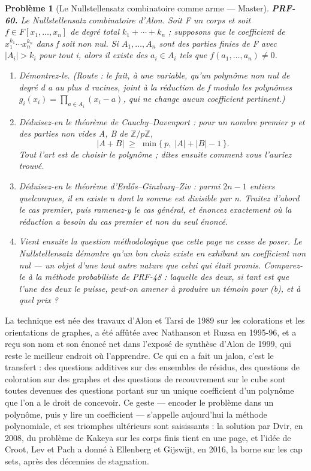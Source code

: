 \documentclass[11pt]{article}
\newtheorem{problem}{Problème}
\begin{document}
\begin{problem}[{Le Nullstellensatz combinatoire comme arme --- Master}]
\textbf{PRF-60.} Le Nullstellensatz combinatoire d'Alon. Soit F un corps et soit
$ f \in F[x_1, \dots, x_n] $ de degré total $ k_1 + \cdots + k_n $ ; supposons que le
coefficient de $ x_1^{k_1} \cdots x_n^{k_n} $ dans f soit non nul. Si
$ A_1, \dots, A_n $ sont des parties finies de F avec $ |A_i| > k_i $ pour tout i, alors
il existe des $ a_i \in A_i $ tels que $ f(a_1, \dots, a_n) \ne 0 $.
\begin{enumerate}
\item[(a)] Démontrez-le. (Route : le fait, à une variable, qu'un polynôme non nul de degré d a au
plus d racines, joint à la réduction de f modulo les polynômes
$ g_i(x_i) = \prod_{a \in A_i} (x_i - a) $, qui ne change aucun coefficient
pertinent.)
\item[(b)] Déduisez-en le théorème de Cauchy--Davenport : pour un nombre premier p et des parties
non vides A, B de $ \mathbb{Z}/p\mathbb{Z} $,
\[ |A + B| \;\ge\; \min\{\, p,\; |A| + |B| - 1 \,\}. \]
Tout l'art est de choisir le polynôme ; dites ensuite comment vous l'auriez
trouvé.
\item[(c)] Déduisez-en le théorème d'Erd\H{o}s--Ginzburg--Ziv : parmi $ 2n - 1 $ entiers quelconques,
il en existe n dont la somme est divisible par n. Traitez d'abord le cas premier, puis
ramenez-y le cas général, et énoncez exactement où la réduction a besoin du cas premier et
non du seul énoncé.
\item[(d)] Vient ensuite la question méthodologique que cette page ne cesse de poser. Le
Nullstellensatz démontre qu'un bon choix existe en exhibant un coefficient non nul --- un
objet d'une tout autre nature que celui qui était promis. Comparez-le à la méthode
probabiliste de PRF-48 : laquelle des deux, si tant est que l'une des deux le puisse,
peut-on amener à produire un témoin pour (b), et à quel prix ?
\end{enumerate}

\end{problem}

\noindent La technique est née des travaux d'Alon et Tarsi de 1989 sur les
colorations et les orientations de graphes, a été affûtée avec Nathanson et Ruzsa en 1995-96,
et a reçu son nom et son énoncé net dans l'exposé de synthèse d'Alon de 1999, qui reste le
meilleur endroit où l'apprendre. Ce qui en a fait un jalon, c'est le transfert : des questions
additives sur des ensembles de résidus, des questions de coloration sur des graphes et des
questions de recouvrement sur le cube sont toutes devenues des questions portant sur un unique
coefficient d'un polynôme que l'on a le droit de concevoir. Ce geste --- encoder le problème
dans un polynôme, puis y lire un coefficient --- s'appelle aujourd'hui la méthode polynomiale,
et ses triomphes ultérieurs sont saisissants : la solution par Dvir, en 2008, du problème de
Kakeya sur les corps finis tient en une page, et l'idée de Croot, Lev et Pach a donné à
Ellenberg et Gijswijt, en 2016, la borne sur les cap sets, après des décennies de
stagnation.
\end{document}
